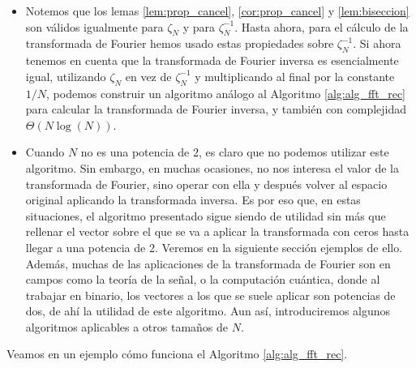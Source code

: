 \documentclass{article}
\begin{document}
\begin{itemize}
    \item Notemos que los lemas \ref{lem:prop_cancel}, \ref{cor:prop_cancel} y \ref{lem:biseccion} son válidos igualmente para $\zeta_N$ y para $\zeta_N^{-1}$. Hasta ahora, para el cálculo de la transformada de Fourier hemos usado estas propiedades sobre $\zeta_N^{-1}$. Si ahora tenemos en cuenta que la transformada de Fourier inversa es esencialmente igual, utilizando $\zeta_N$ en vez de $\zeta_N^{-1}$ y multiplicando al final por la constante $1/N$, podemos construir un algoritmo análogo al Algoritmo \ref{alg:alg_fft_rec} para calcular la transformada de Fourier inversa, y también con complejidad $\Theta(N \log(N))$.
    
    \item Cuando $N$ no es una potencia de 2, es claro que no podemos utilizar este algoritmo. Sin embargo, en muchas ocasiones, no nos interesa el valor de la transformada de Fourier, sino operar con ella y después volver al espacio original aplicando la transformada inversa. Es por eso que, en estas situaciones, el algoritmo presentado sigue siendo de utilidad sin más que rellenar el vector sobre el que se va a aplicar la transformada con ceros hasta llegar a una potencia de 2. Veremos en la siguiente sección ejemplos de ello. Además, muchas de las aplicaciones de la transformada de Fourier son en campos como la teoría de la señal, o la computación cuántica, donde al trabajar en binario, los vectores a los que se suele aplicar son potencias de dos, de ahí la utilidad de este algoritmo. Aun así, introduciremos algunos algoritmos aplicables a otros tamaños de $N$.
\end{itemize}

Veamos en un ejemplo cómo funciona el Algoritmo \ref{alg:alg_fft_rec}.
\end{document}
